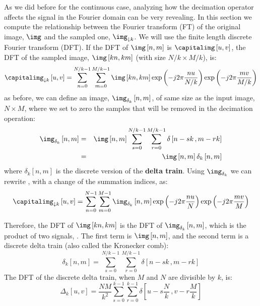 As we did before for the continuous case, analyzing how the decimation operator affects the signal in the Fourier domain can be very revealing.
In this section we compute the relationship between the Fourier transform (FT) of the original image, $\img$ and the sampled one, $\img_{\downarrow k}$. We will use the finite length discrete Fourier transform (DFT). If the DFT of $\img \left[n,m\right]$ is $\capitalimg \left[u,v\right]$, the DFT of the sampled image, $\img \left[kn,km\right]$ (with size $N/k \times M/k$), is:
\begin{equation}
	\capitalimg_{\downarrow k} \left[u,v\right]   = \sum_{n=0}^{N/k-1} \sum_{m=0}^{M/k-1} \img \left[kn,km\right] \exp{ \left(  -j2\pi \frac{nu}{N/k} \right)}  \exp{ \left(  -j2\pi \frac{mv}{M/k} \right)}
	\label{eq:down1}
\end{equation}
as before, we can define an image, $\img_{\delta_k} \left[n,m\right]$, of same size as the input image, $N \times M$, where we set to zero the samples that will be removed in the decimation operation:
\begin{eqnarray}
	\img_{\delta_k} \left[n,m\right] &=& \img \left[n,m\right] \sum_{s=0}^{N/k-1} \sum_{r=0}^{M/k-1} \delta \left[n - sk \, ,m - rk \right] \\
	&=&  \img \left[n,m\right]  \delta_k \left[n,m\right]
	\label{eq:down2}
\end{eqnarray}
where $\delta_k \left[n,m\right]$ is the discrete version of the {\bf delta train}. Using $\img_{\delta_k}$ we can rewrite \eqn{\ref{eq:down1}}, with a change of the summation indices, as:
\begin{equation}
	\capitalimg_{\downarrow k} \left[u,v\right]   = \sum_{n=0}^{N-1} \sum_{m=0}^{M-1} \img_{\delta_k} \left[n,m\right] \exp{ \left(  -j2\pi \frac{nu}{N} \right)}  \exp{ \left(  -j2\pi \frac{mv}{M} \right)}
\end{equation}

Therefore, the DFT of $\img\left[kn,km\right]$ is the DFT of $\img_{\delta_k} \left[n,m\right]$, which is the product of two signals, \eqn{\ref{eq:down2}}. The first term is $\img \left[n,m\right]$, and the second term is a discrete delta train (also called the Kronecker comb):
\begin{equation}
	\delta_k \left[n,m\right]  =  \sum_{s=0}^{N/k-1} \sum_{r=0}^{M/k-1} \delta \left[n - sk \, ,m - rk \right]
\end{equation}
The DFT of the discrete delta train, when $M$ and $N$ are divisible by $k$, is:
\begin{equation}
	\Delta_k \left[u,v\right]  = \frac{NM}{k^2}  \sum_{s=0}^{k-1} \sum_{r=0}^{k-1} \delta \left[u - s\frac{N}{k} \, ,v - r\frac{M}{k} \right]
\end{equation}

